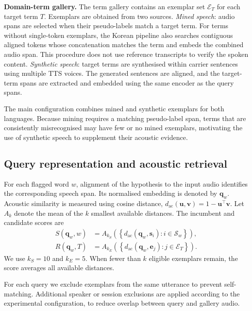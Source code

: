 \documentclass{article}
\newcommand{\Sgal}{\mathcal{S}}
\newcommand{\Egal}{\mathcal{E}}
\begin{document}
\textbf{Domain-term gallery.} The term gallery contains an exemplar set $\Egal_T$ for each target term $T$. Exemplars are obtained from two sources. \emph{Mined speech}: audio spans are selected when their pseudo-labels match a target term. For terms without single-token exemplars, the Korean pipeline also searches contiguous aligned tokens whose concatenation matches the term and embeds the combined audio span. This procedure does not use reference transcripts to verify the spoken content. \emph{Synthetic speech}: target terms are synthesised within carrier sentences using multiple TTS voices. The generated sentences are aligned, and the target-term spans are extracted and embedded using the same encoder as the query spans.

The main configuration combines mined and synthetic exemplars for both languages. Because mining requires a matching pseudo-label span, terms that are consistently misrecognised may have few or no mined exemplars, motivating the use of synthetic speech to supplement their acoustic evidence.

\subsection{Query representation and acoustic retrieval}
\label{sec:gate}

For each flagged word $w$, alignment of the hypothesis to the input audio identifies the corresponding speech span. Its normalised embedding is denoted by $\mathbf{q}_w$. Acoustic similarity is measured using cosine distance, $d_{\mathrm{ac}}(\mathbf{u},\mathbf{v}) = 1-\mathbf{u}^{\!\top}\mathbf{v}$. Let $A_k$ denote the mean of the $k$ smallest available distances. The incumbent and candidate scores are
\begin{align}
S(\mathbf{q}_w,w) &= A_{k_S}\!\left(\left\{d_{\mathrm{ac}}(\mathbf{q}_w,\mathbf{s}_i) : i\in\Sgal_w\right\}\right),
\label{eq:S}\\
R(\mathbf{q}_w,T) &= A_{k_E}\!\left(\left\{d_{\mathrm{ac}}(\mathbf{q}_w,\mathbf{e}_j) : j\in\Egal_T\right\}\right).
\label{eq:R}
\end{align}
We use $k_S=10$ and $k_E=5$. When fewer than $k$ eligible exemplars remain, the
score averages all available distances.

For each query we exclude exemplars from the same utterance to prevent self-matching. Additional speaker or session exclusions are applied according to the experimental configuration, to reduce overlap between query and gallery audio.
\end{document}
